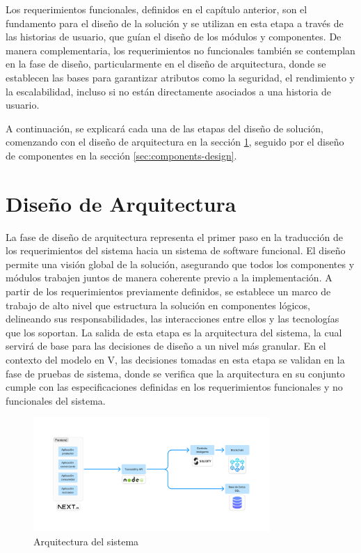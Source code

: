 Los requerimientos funcionales, definidos en el capítulo anterior, son el fundamento para el diseño de la solución y se utilizan en esta etapa a través de las historias de usuario, que guían el diseño de los módulos y componentes. De manera complementaria, los requerimientos no funcionales también se contemplan en la fase de diseño, particularmente en el diseño de arquitectura, donde se establecen las bases para garantizar atributos como la seguridad, el rendimiento y la escalabilidad, incluso si no están directamente asociados a una historia de usuario.

A continuación, se explicará cada una de las etapas del diseño de solución, comenzando con el diseño de arquitectura en la sección \ref{sec:module-design}, seguido por el diseño de componentes en la sección \ref{sec:components-design}.

\section{Diseño de Arquitectura}
\label{sec:module-design}

La fase de diseño de arquitectura representa el primer paso en la traducción de los requerimientos del sistema hacia un sistema de software funcional. El diseño permite una visión global de la solución, asegurando que todos los componentes y módulos trabajen juntos de manera coherente previo a la implementación. A partir de los requerimientos previamente definidos, se establece un marco de trabajo de alto nivel que estructura la solución en componentes lógicos, delineando sus responsabilidades, las interacciones entre ellos y las tecnologías que los soportan. La salida de esta etapa es la arquitectura del sistema, la cual servirá de base para las decisiones de diseño a un nivel más granular. En el contexto del modelo en V, las decisiones tomadas en esta etapa se validan en la fase de pruebas de sistema, donde se verifica que la arquitectura en su conjunto cumple con las especificaciones definidas en los requerimientos funcionales y no funcionales del sistema.
\begin{figure}[!htb]
    \centering
    \includegraphics[width=0.8\textwidth]{Figures/software-architecture.png}
    \caption{Arquitectura del sistema}
    \label{fig:software-architecture}
\end{figure}


